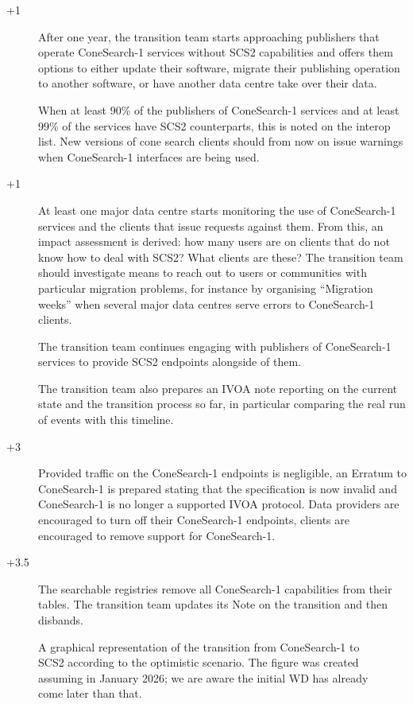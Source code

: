 \documentclass[11pt,a4paper]{ivoa}
\begin{document}
\begin{description}
\item[+1]  After one year, the transition team starts
approaching publishers that operate ConeSearch-1 services without SCS2
capabilities and offers them options to either update their software,
migrate their publishing operation to another software, or have another
data centre take over their data.

\item[] When at least 90\% of the publishers of ConeSearch-1
services and at least 99\% of the services have SCS2 counterparts, this
is noted on the interop list.  New versions of cone search clients
should from now on issue warnings when ConeSearch-1 interfaces are being
used.

\item[+1] At least one major data centre starts monitoring the
use of ConeSearch-1 services and the clients that issue requests against
them.  From this, an impact assessment is derived: how many users are on
clients that do not know how to deal with SCS2?  What clients are these?
The transition team should investigate means to reach out to users or
communities with particular migration problems, for instance by
organising ``Migration weeks'' when several major data centres serve
errors to ConeSearch-1 clients.

The transition team continues engaging with publishers of ConeSearch-1
services to provide SCS2 endpoints alongside of them.

The transition team also prepares an IVOA note reporting on the current
state and the transition process so far, in particular comparing the
real run of events with this timeline.

\item[+3] Provided traffic on the ConeSearch-1 endpoints is
negligible, an Erratum to ConeSearch-1 is prepared stating that the
specification is now invalid and ConeSearch-1 is no longer a supported
IVOA protocol.  Data providers are encouraged to turn off their
ConeSearch-1 endpoints, clients are encouraged to remove support for
ConeSearch-1.

\item[+3.5] The searchable registries remove all ConeSearch-1
capabilities from their tables.  The transition team updates its Note on
the transition and then disbands.

\end{description}


\begin{figure}
\caption{A graphical representation of the transition from ConeSearch-1
to SCS2 according to the optimistic scenario.  The figure was created
assuming  in January 2026; we are aware the
initial WD has already come later than that.}
\label{fig:timeline}
\end{figure}
\end{document}
